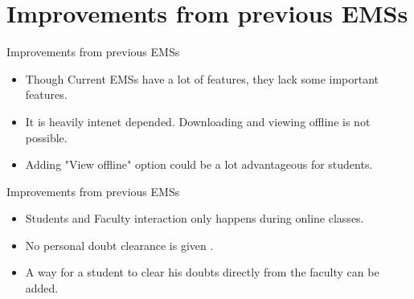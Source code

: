 \documentclass{beamer}
\begin{document}
\begin{frame}
	\tableofcontents
\end{frame}
\newcommand{\bfr}[2]{\section{#1} \begin{frame}{#1} #2 \end{frame}}

\bfr{Improvements from previous EMSs}{

    \begin{itemize}
        \item Though Current EMSs have a lot of features, they lack some important features.
        \item It is heavily intenet depended. Downloading and viewing offline is not possible.
        \item Adding "View offline" option could be a lot advantageous for students.
    \end{itemize}
    
}

\begin{frame}{Improvements from previous EMSs}
    \begin{itemize}
        \item Students and Faculty interaction only happens during online classes.
        \item No personal doubt clearance is given .
        \item A way for a student to clear his doubts directly from the faculty can be added.
    \end{itemize}
\end{frame}
\end{document}
